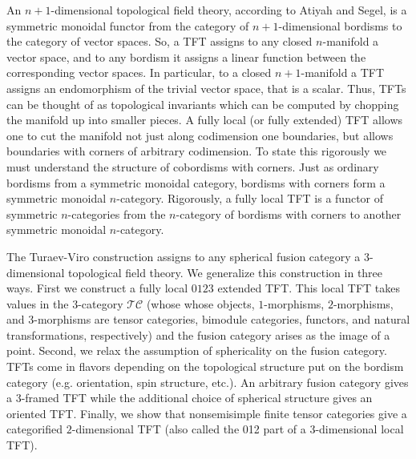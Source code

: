 \documentclass{amsart}
\begin{document}


An $n+1$-dimensional topological field theory, according to Atiyah and Segel, is a symmetric monoidal functor from the category of $n+1$-dimensional bordisms to the category of vector spaces.  So, a TFT assigns to any closed $n$-manifold a vector space, and to any bordism it assigns a linear function between the corresponding vector spaces.  In particular, to a closed $n+1$-manifold a TFT assigns an endomorphism of the trivial vector space, that is a scalar.  Thus, TFTs can be thought of as topological invariants which can be computed by chopping the manifold up into smaller pieces.  A fully local (or fully extended) TFT allows one to cut the manifold not just along codimension one boundaries, but allows boundaries with corners of arbitrary codimension.  To state this rigorously we must understand the structure of cobordisms with corners.  Just as ordinary bordisms from a symmetric monoidal category, bordisms with corners  form a symmetric monoidal $n$-category.  Rigorously, a fully local TFT is a functor of symmetric $n$-categories from the $n$-category of bordisms with corners to another symmetric monoidal $n$-category.  

The Turaev-Viro construction assigns to any spherical fusion category a 3-dimensional topological field theory.  We generalize this construction in three ways.  First we construct a fully local $0123$ extended TFT.  This local TFT takes values in the $3$-category $\mathcal{TC}$ (whose whose objects, $1$-morphisms, $2$-morphisms, and $3$-morphisms are tensor categories, bimodule categories, functors, and natural transformations, respectively) and the fusion category arises as the image of a point.  Second, we relax the assumption of sphericality on the fusion category.  TFTs come in flavors depending on the topological structure put on the bordism category (e.g. orientation, spin structure, etc.).  An arbitrary fusion category gives a $3$-framed TFT while the additional choice of spherical structure gives an oriented TFT.  Finally, we show that nonsemisimple finite tensor categories give a categorified $2$-dimensional TFT (also called the 012 part of a 3-dimensional local TFT).
\end{document}
